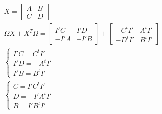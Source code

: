 \documentclass{article}
\begin{document}
\begin{gather*}
    X = \begin{bmatrix}
        A & B\\
        C & D
    \end{bmatrix}\\
    \Omega X + X^{T}\Omega = \begin{bmatrix}
       I'C & I'D\\
       -I'A & -I'B 
    \end{bmatrix} + \begin{bmatrix}
        -C^{t}I' & A^{t}I'\\
        -D^{t}I' & B^{t}I'
    \end{bmatrix}\\
    \begin{cases}
        I'C = C^{t}I'\\
        I'D = -A^{t}I'\\
        I'B = B^{t}I'
    \end{cases}\\
    \begin{cases}
        C = I'C^{t}I'\\
        D = -I'A^{t}I'\\
        B = I'B^tI'
    \end{cases}
\end{gather*}
\end{document}
